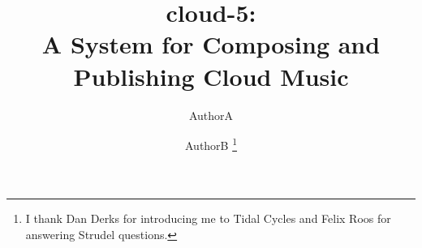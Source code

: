 \documentclass[runningheads,a4paper]{llncs}
\begin{document}
\mainmatter  %

\title{cloud-5:\\A System for Composing and Publishing Cloud Music}




\author{AuthorA\and AuthorB \thanks{I thank Dan Derks for introducing me to Tidal Cycles and Felix Roos for answering Strudel questions.}}
%


%
%
\end{document}
